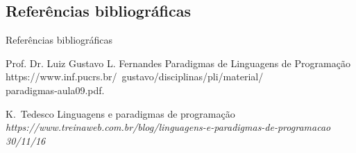\documentclass{beamer}
\begin{document}
\subsection{Referências bibliográficas}

\begin{frame}[allowframebreaks]{Referências bibliográficas}

  \begin{thebibliography}{10}
    
  \beamertemplatearticlebibitems

    Prof. Dr. Luiz Gustavo L. Fernandes
    \newblock Paradigmas de Linguagens de Programação
    \newblock https://www.inf.pucrs.br/~gustavo/disciplinas/pli/material/\\paradigmas-aula09.pdf.
 
    
  \beamertemplatearticlebibitems

    K.~Tedesco
    \newblock Linguagens e paradigmas de programação
    \newblock \em https://www.treinaweb.com.br/blog/linguagens-e-paradigmas-de-programacao 30/11/16
  \end{thebibliography}
\end{frame}
\end{document}
